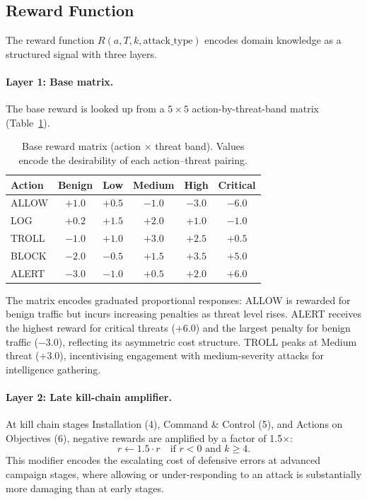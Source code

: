 \subsection{Reward Function}
\label{sec:reward}

The reward function $R(a, T, k, \text{attack\_type})$ encodes domain
knowledge as a structured signal with three layers.

\paragraph{Layer 1: Base matrix.}
The base reward is looked up from a $5 \times 5$ action-by-threat-band matrix
(Table~\ref{tab:reward_matrix_meth}).

\begin{table}[ht]
  \centering
  \caption{Base reward matrix (action $\times$ threat band).
           Values encode the desirability of each action--threat pairing.}
  \label{tab:reward_matrix_meth}
  \begin{tabular}{lccccc}
    \toprule
    Action & Benign & Low & Medium & High & Critical \\
    \midrule
    ALLOW & $+1.0$ & $+0.5$ & $-1.0$ & $-3.0$ & $-6.0$ \\
    LOG   & $+0.2$ & $+1.5$ & $+2.0$ & $+1.0$ & $-1.0$ \\
    TROLL & $-1.0$ & $+1.0$ & $+3.0$ & $+2.5$ & $+0.5$ \\
    BLOCK & $-2.0$ & $-0.5$ & $+1.5$ & $+3.5$ & $+5.0$ \\
    ALERT & $-3.0$ & $-1.0$ & $+0.5$ & $+2.0$ & $+6.0$ \\
    \bottomrule
  \end{tabular}
\end{table}

The matrix encodes graduated proportional responses: ALLOW is rewarded for
benign traffic but incurs increasing penalties as threat level rises.
ALERT receives the highest reward for critical threats ($+6.0$) and the
largest penalty for benign traffic ($-3.0$), reflecting its asymmetric cost
structure.
TROLL peaks at Medium threat (+3.0), incentivising engagement with
medium-severity attacks for intelligence gathering.

\paragraph{Layer 2: Late kill-chain amplifier.}
At kill chain stages Installation (4), Command \& Control (5), and
Actions on Objectives (6), negative rewards are amplified by a factor of
1.5$\times$:
%
\begin{equation}
  r \leftarrow 1.5 \cdot r \quad \text{if } r < 0 \text{ and } k \geq 4.
\end{equation}
%
This modifier encodes the escalating cost of defensive errors at advanced
campaign stages, where allowing or under-responding to an attack is
substantially more damaging than at early stages.

